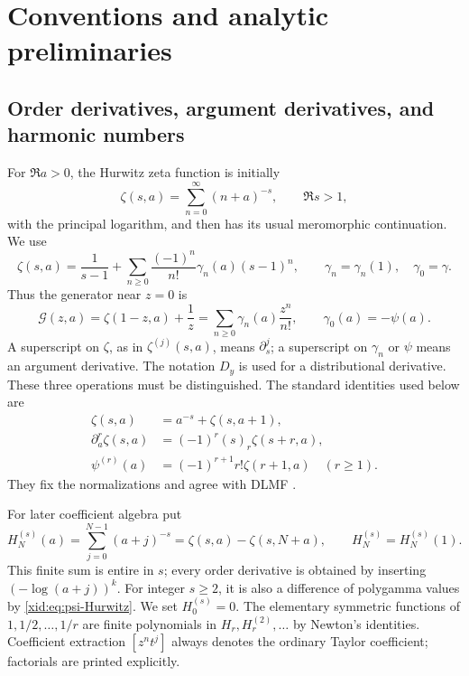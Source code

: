 \documentclass[11pt,a4paper]{article}
\numberwithin{equation}{section}
\theoremstyle{definition}
\theoremstyle{remark}
\begin{document}


\section{Conventions and analytic preliminaries}
\label{xid:sec:preliminaries}

\subsection{Order derivatives, argument derivatives, and harmonic numbers}

For $\Re a>0$, the Hurwitz zeta function is initially
\[
 \zeta(s,a)=\sum_{n=0}^{\infty}(n+a)^{-s},\qquad\Re s>1,
\]
with the principal logarithm, and then has its usual meromorphic
continuation. We use
\begin{equation}\label{xid:eq:Stieltjes-convention}
 \zeta(s,a)=\frac1{s-1}
  +\sum_{n\ge0}\frac{(-1)^n}{n!}\gamma_n(a)(s-1)^n,
 \qquad \gamma_n=\gamma_n(1),\quad\gamma_0=\gamma.
\end{equation}
Thus the generator near $z=0$ is
\begin{equation}\label{xid:eq:G-convention}
 \mathscr G(z,a)=\zeta(1-z,a)+\frac1z
       =\sum_{n\ge0}\gamma_n(a)\frac{z^n}{n!},
 \qquad\gamma_0(a)=-\psi(a).
\end{equation}
A superscript on $\zeta$, as in $\zeta^{(j)}(s,a)$, means
$\partial_s^j$; a superscript on $\gamma_n$ or $\psi$ means an
argument derivative. The notation $D_y$ is used for a distributional
derivative. These three operations must be distinguished.
The standard identities used below are
\begin{align}
 \zeta(s,a)&=a^{-s}+\zeta(s,a+1),\label{xid:eq:Hurwitz-shift}\\
 \partial_a^r\zeta(s,a)&=(-1)^r(s)_r\zeta(s+r,a),\label{xid:eq:Hurwitz-arg}\\
 \psi^{(r)}(a)&=(-1)^{r+1}r!\zeta(r+1,a)\quad(r\ge1).
 \label{xid:eq:psi-Hurwitz}
\end{align}
They fix the normalizations and agree with DLMF
\cite{DLMFhurwitz,hsh:DLMFPolygamma}.

For later coefficient algebra put
\[
 H_N^{(s)}(a)=\sum_{j=0}^{N-1}(a+j)^{-s}
             =\zeta(s,a)-\zeta(s,N+a),
 \qquad H_N^{(s)}=H_N^{(s)}(1).
\]
This finite sum is entire in $s$; every order derivative is obtained by
inserting $(-\log(a+j))^k$. For integer $s\ge2$, it is also a difference
of polygamma values by \eqref{xid:eq:psi-Hurwitz}. We set $H_0^{(s)}=0$.
The elementary symmetric functions of $1,1/2,\ldots,1/r$ are finite
polynomials in $H_r,H_r^{(2)},\ldots$ by Newton's identities.
Coefficient extraction $[z^nt^j]$ always denotes the ordinary Taylor
coefficient; factorials are printed explicitly.
\end{document}
